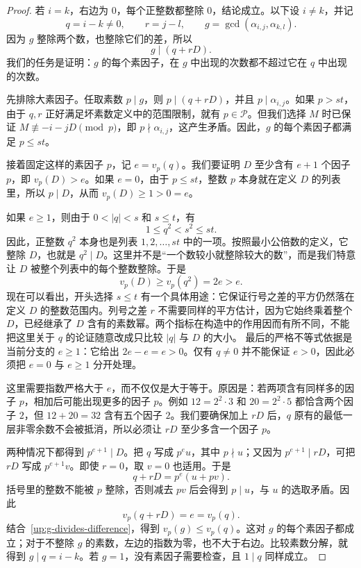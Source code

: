 \documentclass[UTF8,a4paper,oneside,openany,fontset=fandol,zihao=-4]{ctexbook}
\theoremstyle{guide}
\begin{document}
\begin{proof}
若 $i=k$，右边为 $0$，每个正整数都整除 $0$，结论成立。以下设 $i\ne k$，并记
\[
q=i-k\ne0,\qquad r=j-l,\qquad
g=\gcd(\alpha_{i,j},\alpha_{k,l}).
\]
因为 $g$ 整除两个数，也整除它们的差，所以
\begin{equation}\label{up:g-divides-difference}
g\mid(q+rD).
\end{equation}
我们的任务是证明：$g$ 的每个素因子，在 $g$ 中出现的次数都不超过它在 $q$ 中出现的次数。

先排除大素因子。任取素数 $p\mid g$，则 $p\mid(q+rD)$，并且 $p\mid\alpha_{i,j}$。如果 $p>st$，由于 $q,r$ 正好满足坏素数定义中的范围限制，就有 $p\in\mathcal P$。但我们选择 $M$ 时已保证 $M\not\equiv-i-jD\pmod p$，即 $p\nmid\alpha_{i,j}$，这产生矛盾。因此，$g$ 的每个素因子都满足 $p\leq st$。

接着固定这样的素因子 $p$，记 $e=v_p(q)$。我们要证明 $D$ 至少含有 $e+1$ 个因子 $p$，即 $v_p(D)>e$。如果 $e=0$，由于 $p\leq st$，整数 $p$ 本身就在定义 $D$ 的列表里，所以 $p\mid D$，从而 $v_p(D)\geq1>0=e$。

如果 $e\geq1$，则由于 $0<|q|<s$ 和 $s\leq t$，有
\[
1\leq q^2<s^2\leq st.
\]
因此，正整数 $q^2$ 本身也是列表 $1,2,\ldots,st$ 中的一项。按照最小公倍数的定义，它整除 $D$，也就是 $q^2\mid D$。这里并不是“一个数较小就整除较大的数”，而是我们特意让 $D$ 被整个列表中的每个整数整除。于是
\[
v_p(D)\geq v_p(q^2)=2e>e.
\]
现在可以看出，开头选择 $s\leq t$ 有一个具体用途：它保证行号之差的平方仍然落在定义 $D$ 的整数范围内。列号之差 $r$ 不需要同样的平方估计，因为它始终乘着整个 $D$，已经继承了 $D$ 含有的素数幂。两个指标在构造中的作用因而有所不同，不能把这里关于 $q$ 的论证随意改成只比较 $|q|$ 与 $D$ 的大小。
最后的严格不等式依据是当前分支的 $e\geq1$：它给出 $2e-e=e>0$。仅有 $q\ne0$ 并不能保证 $e>0$，因此必须把 $e=0$ 与 $e\geq1$ 分开处理。

这里需要指数严格大于 $e$，而不仅仅是大于等于。原因是：若两项含有同样多的因子 $p$，相加后可能出现更多的因子 $p$。例如 $12=2^2\cdot3$ 和 $20=2^2\cdot5$ 都恰含两个因子 $2$，但 $12+20=32$ 含有五个因子 $2$。我们要确保加上 $rD$ 后，$q$ 原有的最低一层非零余数不会被抵消，所以必须让 $rD$ 至少多含一个因子 $p$。

两种情况下都得到 $p^{e+1}\mid D$。把 $q$ 写成 $p^eu$，其中 $p\nmid u$；又因为 $p^{e+1}\mid rD$，可把 $rD$ 写成 $p^{e+1}v$。即使 $r=0$，取 $v=0$ 也适用。于是
\[
q+rD=p^e(u+pv).
\]
括号里的整数不能被 $p$ 整除，否则减去 $pv$ 后会得到 $p\mid u$，与 $u$ 的选取矛盾。因此
\[
v_p(q+rD)=e=v_p(q).
\]
结合~\eqref{up:g-divides-difference}，得到 $v_p(g)\leq v_p(q)$。这对 $g$ 的每个素因子都成立；对于不整除 $g$ 的素数，左边的指数为零，也不大于右边。比较素数分解，就得到 $g\mid q=i-k$。若 $g=1$，没有素因子需要检查，且 $1\mid q$ 同样成立。
\end{proof}
\end{document}
